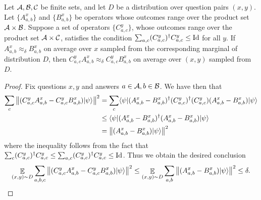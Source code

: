 \begin{fact}
  \label{fact:add-a-proj}
  Let $\cal{A},\cal{B},\cal{C}$ be finite sets, and let $D$ be a distribution
  over question pairs $(x,y)$.
  Let $\{A_{a,b}^x\}$ and $\{B_{a,b}^x\}$ be operators whose outcomes range over the
  product set $\cal{A} \times \cal{B}$.
  Suppose a set of operators $\{C_{a,c}^y\}$, whose outcomes range over the
  product set $\cal{A} \times \cal{C}$, satisfies the condition $\sum_{a,c}
  (C_{a,c}^y)^\dagger C_{a,c}^y \leq \Id$ for all $y$.
  If $A_{a,b}^x \approx_\delta B_{a,b}^x$ on average over $x$ sampled from the
  corresponding marginal of distribution $D$, then $C^y_{a,c} A^x_{a,b}
  \approx_\delta C^y_{a,c} B^x_{a,b}$ on average over $(x,y)$ sampled from $D$.
\end{fact}
\begin{proof}
  Fix questions $x,y$ and answers $a \in \cal{A},b \in \cal{B}$. We have then that
  \begin{align}
    \sum_{c} \left \| (C^y_{a,c} A^x_{a,b} - C^y_{a,c} B^x_{a,b} ) \ket{\psi} \right \|^2
    & = \sum_{c} \bra{\psi} (A^x_{a,b} - B^x_{a,b})^\dagger (C^y_{a,c})^\dagger (C^y_{a,c})
      (A^x_{a,b} - B^x_{a,b} ) \ket{\psi}\\
    & \leq \bra{\psi} (A^x_{a,b} - B^x_{a,b})^\dagger
      (A^x_{a,b} - B^x_{a,b} ) \ket{\psi} \\
    & = \left \| (A^x_{a,b} - B^x_{a,b})\ket{\psi} \right \|^2
  \end{align}
  where the inequality follows from the fact that $\sum_c (C_{a,c}^y)^\dagger
  C_{a,c}^y \leq \sum_{a,c} (C_{a,c}^y)^\dagger C_{a,c}^y \leq \Id$.
  Thus we obtain the desired conclusion
  \begin{equation*}
    \E_{(x,y) \sim D} \sum_{a,b,c} \left \| (C^y_{a,c} A^x_{a,b} - C^y_{a,c} B^x_{a,b} )
      \ket{\psi} \right \|^2 	\leq \E_{(x,y) \sim D} \sum_{a,b}
    \left \| (A^x_{a,b} - B^x_{a,b})\ket{\psi} \right \|^2 \leq \delta.
  \end{equation*}
\end{proof}


